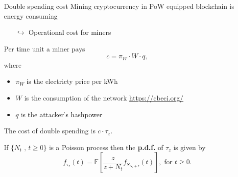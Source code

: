 \documentclass{beamer}
\begin{document}
\begin{frame}{Double spending cost}
\scriptsize
Mining cryptocurrency in PoW equipped blockchain is energy consuming
\begin{itemize}
\item[$\hookrightarrow$] Operational cost for miners
\end{itemize}
Per time unit a miner pays
$$
c = \pi_W\cdot W\cdot q,
$$
where 
\begin{itemize}
  \item $\pi_W$ is the electricty price per kWh
  \item $W$ is the consumption of the network \url{https://cbeci.org/}
  \item  $q$ is the attacker's hashpower 
\end{itemize}
\begin{tcolorbox}[enhanced,drop shadow, title=Fact]
The cost of double spending is $c\cdot \tau_z$.
\end{tcolorbox}
\begin{tcolorbox}[enhanced,drop shadow, title=Theorem (\textbf{P.d.f.} of the double spending time)]
If $\{N_t\text{ , }t\geq0\}$ is a Poisson process then the \textbf{p.d.f.} of $\tau_z$ is given by
\begin{equation*}
f_{\tau_z}(t)=\mathbb{E}\left[\frac{z}{z+N_t}f_{S_{N_t+z}}(t)\right],\text{ for }t\geq0.
\end{equation*}
\end{tcolorbox}
\end{frame}
\end{document}
